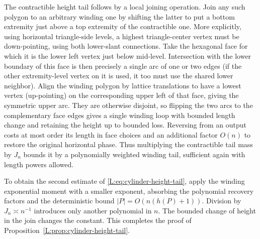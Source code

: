 The contractible height tail follows by a local joining operation. Join any such polygon to an arbitrary winding one by shifting the latter to put a bottom extremity just above a top extremity of the contractible one. More explicitly, using horizontal triangle-side levels, a highest triangle-center vertex must be down-pointing, using both lower-slant connections. Take the hexagonal face for which it is the lower left vertex just below mid-level. Intersection with the lower boundary of this face is then precisely a single arc of one or two edges (if the other extremity-level vertex on it is used, it too must use the shared lower neighbor). Align the winding polygon by lattice translations to have a lowest vertex (up-pointing) on the corresponding upper left of that face, giving the symmetric upper arc. They are otherwise disjoint, so flipping the two arcs to the complementary face edges gives a single winding loop with bounded length change and retaining the height up to bounded loss. Reversing from an output costs at most order its length in face choices and an additional factor \(O(n)\) to restore the original horizontal phase. Thus multiplying the contractible tail mass by \(J_n\) bounds it by a polynomially weighted winding tail, sufficient again with length powers allowed.


To obtain the second estimate of
\eqref{L:eq:cylinder-height-tail}, apply the winding exponential moment
with a smaller exponent, absorbing the polynomial recovery factors and
the deterministic bound $|P|=O(n(h(P)+1))$. Division by
$J_n\asymp n^{-1}$ introduces only another polynomial in $n$.
The bounded change of height in the join changes the constant.
This completes the proof of Proposition~\ref{L:prop:cylinder-height-tail}.
